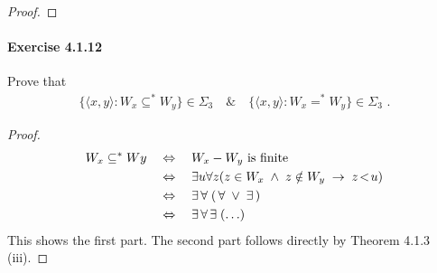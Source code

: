 \documentclass[a4paper,11pt]{article}
\begin{document}
\begin{proof}

\end{proof}


\paragraph{Exercise 4.1.12}

Prove that
\begin{align*}
  \{ \langle x, y \rangle : W_x \subseteq^* W_y \} \in \Sigma_3 \quad \& \quad \{ \langle x, y \rangle : W_x =^* W_y \} \in \Sigma_3 \text{ .}
\end{align*}
\begin{proof}
\begin{align*}
  W_x \subseteq^* Wy \quad & \Leftrightarrow \quad \text{$W_x - W_y$ is finite}\\
  & \Leftrightarrow \quad \exists u \forall z(z \in W_x \; \wedge \; z \notin W_y \; \rightarrow \; z \! < \! u)\\
  & \Leftrightarrow \quad \exists \, \forall \; ( \, \forall \; \vee \; \exists \, )\\
  & \Leftrightarrow \quad \exists \, \forall \, \exists \; (\ldots) \qedhere
\end{align*}
This shows the first part. The second part follows directly by Theorem 4.1.3 (iii).
\end{proof}
\end{document}
